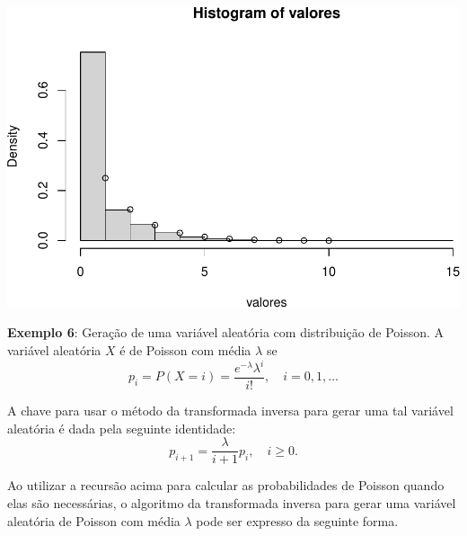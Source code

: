 \documentclass[
]{book}
\begin{document}
\includegraphics{introR_files/figure-latex/unnamed-chunk-289-1.pdf}

\textbf{Exemplo 6}: Geração de uma variável aleatória com distribuição de
Poisson. A variável aleatória \(X\) é de Poisson com média \(\lambda\) se
\[p_{i} = P(X = i) = \frac{e^{-\lambda}\lambda^i}{i!}, \quad i=0,1,\ldots\]

A chave para usar o método da transformada inversa para gerar uma tal
variável aleatória é dada pela seguinte identidade:
\[p_{i+1}=\frac{\lambda}{i+1}p_{i}, \quad i\geq 0.\]

Ao utilizar a recursão acima para calcular as probabilidades de Poisson
quando elas são necessárias, o algoritmo da transformada inversa para
gerar uma variável aleatória de Poisson com média \(\lambda\) pode ser
expresso da seguinte forma.
\end{document}
